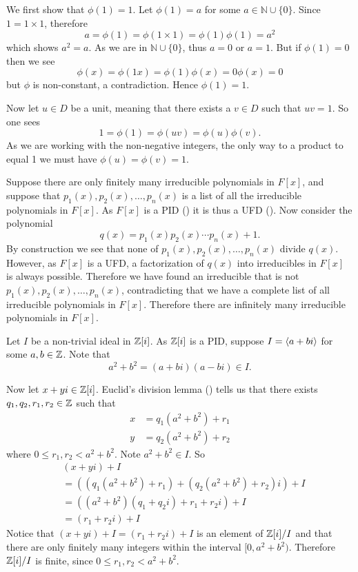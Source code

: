 \begin{questions}
    \item We first show that $\phi(1) = 1$. Let $\phi(1) = a$ for some $a \in \mathbb{N} \cup \{0\}$. Since $1 = 1 \times 1$, therefore
    \[
        a = \phi(1) = \phi(1 \times 1) = \phi(1)\phi(1) = a^2
    \]
    which shows $a^2 = a$. As we are in $\mathbb{N} \cup \{0\}$, thus $a = 0$ or $a = 1$. But if $\phi(1) = 0$ then we see
    \[
        \phi(x) = \phi(1x) = \phi(1)\phi(x) = 0\phi(x) = 0
    \]
    but $\phi$ is non-constant, a contradiction. Hence $\phi(1) = 1$.

    Now let $u \in D$ be a unit, meaning that there exists a $v \in D$ such that $uv = 1$. So one sees
    \[
        1 = \phi(1) = \phi(uv) = \phi(u)\phi(v).
    \]
    As we are working with the non-negative integers, the only way to a product to equal 1 we must have $\phi(u) = \phi(v) = 1$.

    \item Suppose there are only finitely many irreducible polynomials in $F[x]$, and suppose that $p_1(x), p_2(x), \dots, p_n(x)$ is a list of all the irreducible polynomials in $F[x]$. As $F[x]$ is a PID () it is thus a UFD (). Now consider the polynomial
    \[
        q(x) = p_1(x)p_2(x)\cdots p_n(x) + 1.
    \]
    By construction we see that none of $p_1(x), p_2(x), \dots, p_n(x)$ divide $q(x)$. However, as $F[x]$ is a UFD, a factorization of $q(x)$ into irreducibles in $F[x]$ is always possible. Therefore we have found an irreducible that is not $p_1(x), p_2(x), \dots, p_n(x)$, contradicting that we have a complete list of all irreducible polynomials in $F[x]$. Therefore there are infinitely many irreducible polynomials in $F[x]$.

    \item Let $I$ be a non-trivial ideal in $\mathbb{Z}[i]$. As $\mathbb{Z}[i]$ is a PID, suppose $I = \left\langle a+bi\right\rangle$ for some $a,b \in \mathbb{Z}$. Note that
    \[
        a^2 + b^2 = (a+bi)(a-bi) \in I.
    \]

    Now let $x+yi \in \mathbb{Z}[i]$. Euclid's division lemma () tells us that there exists $q_1, q_2, r_1, r_2 \in \mathbb{Z}$ such that
    \begin{align*}
        x &= q_1(a^2+b^2) + r_1\\
        y &= q_2(a^2+b^2) + r_2
    \end{align*}
    where $0 \leq r_1, r_2 < a^2+b^2$. Note $a^2+b^2 \in I$. So
    \begin{align*}
        &(x+yi)+I\\
        &= \left(\left(q_1(a^2+b^2) + r_1\right) + \left(q_2(a^2+b^2) + r_2\right)i\right) + I\\
        &= \left((a^2+b^2)(q_1+q_2i) + r_1 + r_2i\right) + I\\
        &= (r_1 + r_2i) + I
    \end{align*}
    Notice that $(x+yi)+I = (r_1+r_2i)+I$ is an element of $\mathbb{Z}[i]/I$ and that there are only finitely many integers within the interval $[0, a^2+b^2)$. Therefore $\mathbb{Z}[i]/I$ is finite, since $0 \leq r_1, r_2 < a^2+b^2$.


\end{questions}
